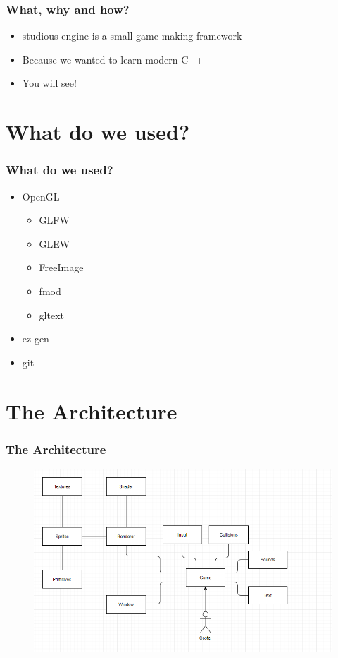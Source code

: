 \documentclass{beamer}
\begin{document}
\begin{frame}
\frametitle{What, why and how?}
\begin{itemize}
\item studious-engine is a small game-making framework
\item Because we wanted to learn modern C++
\item You will see!
\end{itemize}
\end{frame}

\section{What do we used?}
\begin{frame}
\frametitle{What do we used?}
\begin{itemize}
\item OpenGL
    \begin {itemize}
    \item GLFW
    \item GLEW
    \item FreeImage
    \item fmod
    \item gltext
    \end {itemize}
\item ez-gen
\item git
\end{itemize}
\end{frame}

\section{The Architecture}
\begin{frame}
\frametitle{The Architecture}
\begin{figure}
\includegraphics[width=\textwidth,height=0.7\textheight]{Studious-Engine_Diagram}
\end{figure}
\end{frame}
\end{document}
